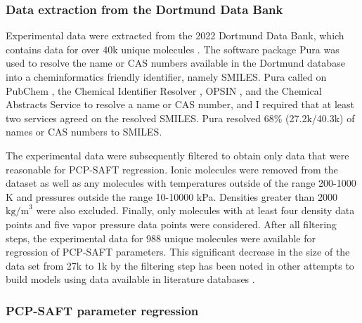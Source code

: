 
\subsubsection{Data extraction from the Dortmund Data Bank}

Experimental data were extracted from the 2022 Dortmund Data Bank, which contains data for over 40k unique molecules \cite{dortmunddatabank}. The software package Pura \cite{purapython} was used to resolve the name or CAS numbers available in the Dortmund database into a cheminformatics friendly identifier, namely SMILES. Pura called on PubChem \cite{Kim2020}, the Chemical Identifier Resolver \cite{cir}, OPSIN \cite{Lowe2011}, and the Chemical Abstracts Service \cite{commonchem} to resolve a name or CAS number, and I required that at least two services agreed on the resolved SMILES. Pura resolved 68\% (27.2k/40.3k) of names or CAS numbers to SMILES. 

The experimental data were subsequently filtered to obtain only data that were reasonable for PCP-SAFT regression. Ionic molecules were removed from the dataset as well as any molecules with temperatures outside of the range 200-1000 K and pressures outside the range 10-10000 kPa. Densities greater than 2000 $\text{kg/m}^{3}$ were also excluded. Finally, only molecules with at least four density data points and five vapor pressure data points were considered. After all filtering steps, the experimental data for 988 unique molecules were available for regression of PCP-SAFT parameters. This significant decrease in the size of the data set from 27k to 1k by the filtering step has been noted in other attempts to build models using data available in literature databases \cite{Fitzner2020, Gao2018}. 

\subsubsection{PCP-SAFT parameter regression}

